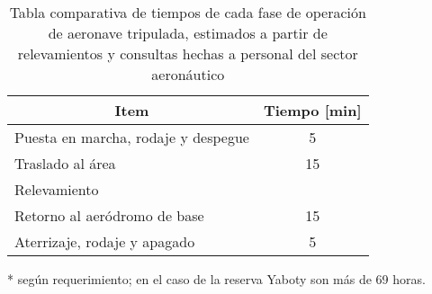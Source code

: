 \begin{table}[]
    \begin{threeparttable}[b]
        \centering
        \caption{Tabla comparativa de tiempos de cada fase de operación de aeronave tripulada, estimados a partir de relevamientos y consultas hechas a personal del sector aeronáutico}
        \label{tab:avión}
        \begin{tabular}{lc}
            \hline
            \multicolumn{1}{c}{\textbf{Item}}   & \multicolumn{1}{l}{\textbf{Tiempo {[}min{]}}} \\ \hline
            \rowcolor[HTML]{FFFFFF} 
            Puesta en marcha, rodaje y despegue & 5                                             \\
            \rowcolor[HTML]{FFFFFF} 
            Traslado al área                    & 15                                            \\
            \rowcolor[HTML]{FFFFFF} 
            Relevamiento                        & {\color[HTML]{000000} \tnote{*}}                      \\
            \rowcolor[HTML]{FFFFFF} 
            Retorno al aeródromo de base        & {\color[HTML]{000000} 15}                     \\
            \rowcolor[HTML]{FFFFFF} 
            Aterrizaje, rodaje y apagado        & {\color[HTML]{000000} 5}                      \\ \hline
        \end{tabular}
         \begin{tablenotes}
            \footnotesize{
           \item [*]según requerimiento; en el caso de la reserva Yaboty son más de 69 horas.
                    }
         \end{tablenotes}
     \end{threeparttable}
\end{table}